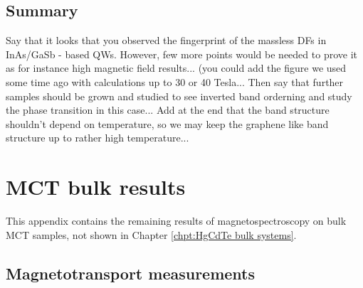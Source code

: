 \documentclass[titlepage,a4paper]{book}
\newcommand{\wciecie}{\quad\phantom{v}}
\newcommand{\myparagraph}[1]{\paragraph{#1}\mbox{}\\}
\begin{document}
\section{Summary}
\wciecie
Say that it looks that you observed the fingerprint of the massless DFs in InAs/GaSb - based QWs. However, few more points would be needed to prove it as for instance high magnetic field results... (you could add the figure we used some time ago with calculations up to 30 or 40 Tesla...
Then say that further samples should be grown and studied to see inverted band orderning and study the phase transition in this case...
Add at the end that the band structure shouldn't depend on temperature, so we may keep the graphene like band structure up to rather high temperature...



\iffalse
\myparagraph{Sample C}
\begin{figure}[H]
	\centering
	\texttt{[image: gfx/wyniki/InAs/LL\_new.png]}
	\vspace{-10pt}
	\caption{\textit{Landau level graph of Sample C as a function of magnetic field at $T$ = 2 K. Vertical arrows with a corresponding Greek letter represent observed transitions between Landau levels in this system. Solid arrows ($\alpha$ and $\beta$) are interband transitions.}}
	\label{fig:LL_new}
\end{figure}

\begin{figure}[H]
	\centering
	\texttt{[image: gfx/wyniki/InAs/Points\_new.png]}
	\vspace{-10pt}
	\caption{\textit{Points corresponding to the minima of transmission for Sample C at $T$ = 2 K with curves showing the calculated transitions as a function of magnetic field.}}
	\label{fig:Points_new}
\end{figure}
\fi


\chapter{MCT bulk results}
\label{Appendix_bulk}
\wciecie
This appendix contains the remaining results of magnetospectroscopy on bulk MCT samples, not shown in Chapter \ref{chpt:HgCdTe bulk systems}.


\section{Magnetotransport measurements}
\end{document}
